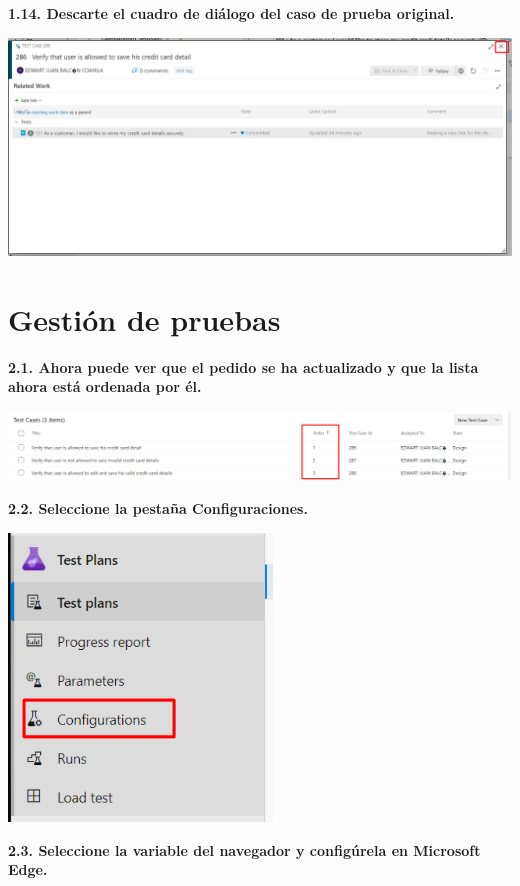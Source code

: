 \documentclass{article}
\begin{document}
\textbf{1.14. Descarte el cuadro de diálogo del caso de prueba original.}

    \begin{center}
		\includegraphics[width=14cm]{./images/1.14} 
	\end{center}


\section{Gestión de pruebas}

\textbf{2.1. Ahora puede ver que el pedido se ha actualizado y que la lista ahora está ordenada por él.}

    \begin{center}
		\includegraphics[width=14cm]{./images/2.3} 
	\end{center}
	
\textbf{2.2.  
Seleccione la pestaña Configuraciones.}

    \begin{center}
		\includegraphics[width=7cm]{./images/2.5} 
	\end{center}
\textbf{2.3. Seleccione la variable del navegador y configúrela en Microsoft Edge.}
\end{document}
